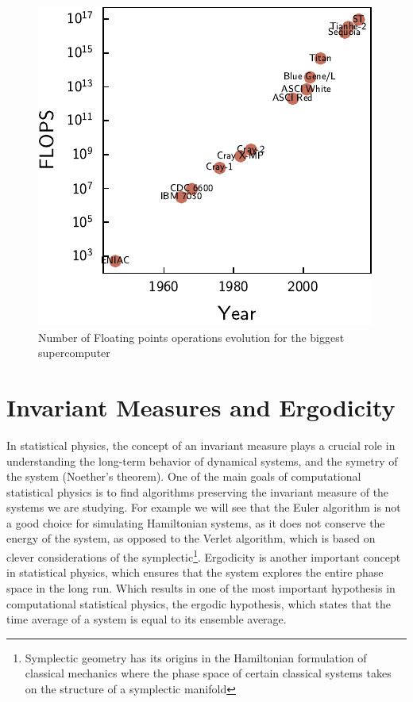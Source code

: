 \documentclass[ansiapaper]{report}
\begin{document}
\begin{multicols}{3}
	\begin{figure}[H]
		\centering
		\includegraphics[width=1\linewidth]{./figures/supercomputer_flops.pdf}
		\caption{Number of Floating points operations evolution for the biggest supercomputer \label{fig:supercomputer_flops}}
	\end{figure}

	\section{Invariant Measures and Ergodicity}

    In statistical physics, the concept of an invariant measure plays a crucial role in understanding the long-term behavior of dynamical systems, and the symetry of the system (Noether's theorem). One of the main goals of computational statistical physics is to find algorithms preserving the invariant measure of the systems we are studying. For example we will see that the Euler algorithm is not a good choice for simulating Hamiltonian systems, as it does not conserve the energy of the system, as opposed to the Verlet algorithm, which is based on clever considerations of the symplectic\footnote{Symplectic geometry has its origins in the Hamiltonian formulation of classical mechanics where the phase space of certain classical systems takes on the structure of a symplectic manifold}.
	Ergodicity is another important concept in statistical physics, which ensures that the system explores the entire phase space in the long run. Which results in one of the most important hypothesis in computational statistical physics, the ergodic hypothesis, which states that the time average of a system is equal to its ensemble average.


\end{multicols}
\end{document}
